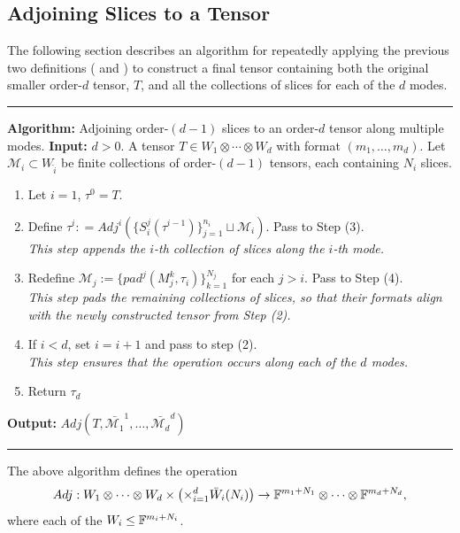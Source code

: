 \documentclass[../Lael_John_MasterThesis_Draft.tex]{subfiles}
\begin{document}
\subsection{Adjoining Slices to a Tensor}\label{subsection:adjoiningprocedure}
The following section describes an algorithm for repeatedly applying the previous two definitions ( and ) to construct a final tensor containing both the original smaller order-$d$ tensor, $T$,  and all the collections of slices for each of the $d$ modes.
\vspace{12pt}
\hrule
\begin{flushleft}
    \textbf{Algorithm:} Adjoining order-$(d-1)$ slices to an order-$d$ tensor along multiple modes.
    \textbf{Input:} $d > 0$. A tensor $T \in W_1 \otimes \cdots \otimes W_d$ with format $(m_1, \ldots, m_d)$. Let $\mathcal{M}_i \subset W_{\hat{i}}$ be finite collections of order-$(d-1)$ tensors, each containing $N_i$ slices.
\end{flushleft}
\begin{flushleft}
    \begin{enumerate}
        \item Let $i = 1$, $\tau^0 = T$. 
        \item Define $\tau^i: =Adj^i(\{S_i^j(\tau^{i-1})\}_{j=1}^{n_i}\sqcup \mathcal{M}_i)$. Pass to Step (3). \\ \textit{This step appends the $i$-th collection of slices along the $i$-th mode.}
        \item Redefine $\mathcal{M}_j := \{ pad^j(M_j^k, \tau_i)\}_{k=1}^{N_j}$ for each $j > i$. Pass to Step (4).\\ \textit{This step pads the remaining collections of slices, so that their formats align with the newly constructed tensor from Step (2).}
        \item If $i < d$, set $i = i + 1$ and pass to step (2).\\ \textit{This step ensures that the operation occurs along each of the $d$ modes.}
        \item Return $\tau_d$
    \end{enumerate}
    \textbf{Output:} $Adj(T, \bar{\mathcal{M}_1}^1, \ldots, \bar{\mathcal{M}_d}^d)$
\end{flushleft}
\hrule
\vspace{12pt}
The above algorithm defines the operation $$Adj: W_1 \otimes \cdots \otimes W_d \times \left(\times_{i=1}^d \bar{W}_i(N_i)\right) \to \mathbb{F}^{m_1 + N_1} \otimes \cdots \otimes \mathbb{F}^{m_d + N_d},$$ where each of the $W_i \leq \mathbb{F}^{m_i + N_i}$.
    
\end{document}
